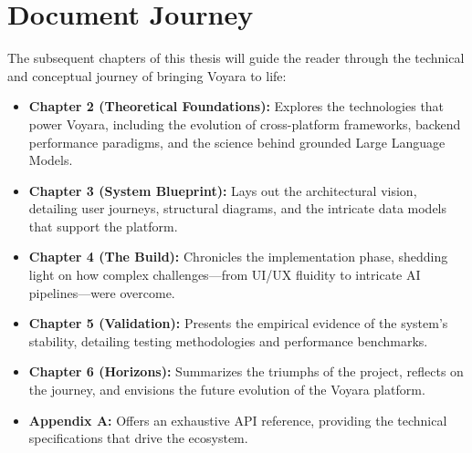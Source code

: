 \section{Document Journey}
The subsequent chapters of this thesis will guide the reader through the technical and conceptual journey of bringing Voyara to life:
\begin{itemize}
    \item \textbf{Chapter 2 (Theoretical Foundations):} Explores the technologies that power Voyara, including the evolution of cross-platform frameworks, backend performance paradigms, and the science behind grounded Large Language Models.
    \item \textbf{Chapter 3 (System Blueprint):} Lays out the architectural vision, detailing user journeys, structural diagrams, and the intricate data models that support the platform.
    \item \textbf{Chapter 4 (The Build):} Chronicles the implementation phase, shedding light on how complex challenges---from UI/UX fluidity to intricate AI pipelines---were overcome.
    \item \textbf{Chapter 5 (Validation):} Presents the empirical evidence of the system’s stability, detailing testing methodologies and performance benchmarks.
    \item \textbf{Chapter 6 (Horizons):} Summarizes the triumphs of the project, reflects on the journey, and envisions the future evolution of the Voyara platform.
    \item \textbf{Appendix A:} Offers an exhaustive API reference, providing the technical specifications that drive the ecosystem.
\end{itemize}
